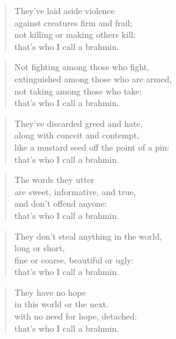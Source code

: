 \documentclass[12pt,openany]{book}%
\begin{document}
\begin{verse}%
They’ve laid aside violence \\
against creatures firm and frail; \\
not killing or making others kill: \\
that’s who I call a brahmin. 

%
\end{verse}

\begin{verse}%
Not fighting among those who fight, \\
extinguished among those who are armed, \\
not taking among those who take: \\
that’s who I call a brahmin. 

%
\end{verse}

\begin{verse}%
They’ve discarded greed and hate, \\
along with conceit and contempt, \\
like a mustard seed off the point of a pin: \\
that’s who I call a brahmin. 

%
\end{verse}

\begin{verse}%
The words they utter \\
are sweet, informative, and true, \\
and don’t offend anyone: \\
that’s who I call a brahmin. 

%
\end{verse}

\begin{verse}%
They don’t steal anything in the world, \\
long or short, \\
fine or coarse, beautiful or ugly: \\
that’s who I call a brahmin. 

%
\end{verse}

\begin{verse}%
They have no hope \\
in this world or the next. \\
with no need for hope, detached: \\
that’s who I call a brahmin. 

%
\end{verse}
\end{document}

